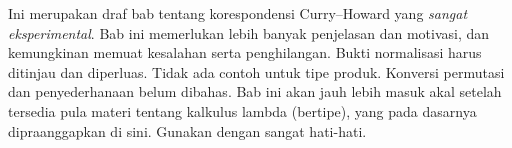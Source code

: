 \documentclass[../../../include/open-logic-chapter]{subfiles}
\begin{document}

\begin{editorial}
  Ini merupakan draf bab tentang korespondensi Curry--Howard yang
  \emph{sangat eksperimental}. Bab ini memerlukan lebih banyak penjelasan
  dan motivasi, dan kemungkinan memuat kesalahan serta penghilangan.
  Bukti normalisasi harus ditinjau dan diperluas. Tidak ada contoh untuk
  tipe produk. Konversi permutasi dan penyederhanaan belum dibahas. Bab
  ini akan jauh lebih masuk akal setelah tersedia pula materi tentang
  kalkulus lambda (bertipe), yang pada dasarnya dipraanggapkan di sini.
  Gunakan dengan sangat hati-hati.
\end{editorial}


\OLEndChapterHook
\end{document}
